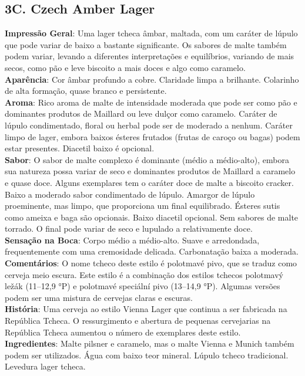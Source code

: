 \subsection*{3C. Czech Amber Lager}
\textbf{Impressão Geral}: Uma lager tcheca âmbar, maltada, com um caráter de lúpulo que pode variar de baixo a bastante significante. Os sabores de malte também podem variar, levando a diferentes interpretações e equilíbrios, variando de mais secos, como pão e leve biscoito a mais doces e algo como caramelo. \\
\textbf{Aparência}: Cor âmbar profundo a cobre. Claridade limpa a brilhante. Colarinho de alta formação, quase branco e persistente. \\
\textbf{Aroma}: Rico aroma de malte de intensidade moderada que pode ser como pão e dominantes produtos de Maillard ou leve dulçor como caramelo. Caráter de lúpulo condimentado, floral ou herbal pode ser de moderado a nenhum. Caráter limpo de lager, embora baixos ésteres frutados (frutas de caroço ou bagas) podem estar presentes. Diacetil baixo é opcional. \\
\textbf{Sabor}: O sabor de malte complexo é dominante (médio a médio-alto), embora sua natureza possa variar de seco e dominantes produtos de Maillard a caramelo e quase doce. Alguns exemplares tem o caráter doce de malte a biscoito cracker. Baixo a moderado sabor condimentado de lúpulo. Amargor de lúpulo proeminente, mas limpo, que proporciona um final equilibrado. Ésteres sutis como ameixa e baga são opcionais. Baixo diacetil opcional. Sem sabores de malte torrado. O final pode variar de seco e lupulado a relativamente doce. \\
\textbf{Sensação na Boca}: Corpo médio a médio-alto. Suave e arredondada, frequentemente com uma cremosidade delicada. Carbonatação baixa a moderada. \\
\textbf{Comentários}: O nome tcheco deste estilo é polotmavé pivo, que se traduz como cerveja meio escura. Este estilo é a combinação dos estilos tchecos polotmavý ležák (11–12,9 °P) e polotmavé speciální pivo (13–14,9 °P). Algumas versões podem ser uma mistura de cervejas claras e escuras. \\
\textbf{História}: Uma cerveja ao estilo Vienna Lager que continua a ser fabricada na República Tcheca. O ressurgimento e abertura de pequenas cervejarias na República Tcheca aumentou o número de exemplares deste estilo. \\
\textbf{Ingredientes}: Malte pilsner e caramelo, mas o malte Vienna e Munich também podem ser utilizados. Água com baixo teor mineral. Lúpulo tcheco tradicional. Levedura lager tcheca. \\
